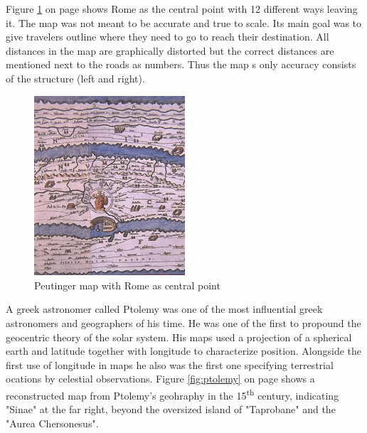 Figure \ref{fig:peutinger-rome} on page \pageref{fig:peutinger-rome} shows Rome as the central point with 12 different ways leaving it. The map was not meant to be accurate and true to scale. Its main goal was to give travelers outline where they need to go to reach their destination. All distances in the map are graphically distorted but the correct distances are mentioned next to the roads as numbers. Thus the map
s only accuracy consists of the structure (left and right).

\begin{figure}[!htb]
\centering
\includegraphics[width=0.5\textwidth,keepaspectratio]{images/history/peutinger_rom.jpg}
\caption[
    Peutinger map with Rome as central point, Urldate: 07.2016 \newline
\small\texttt{\url{https://web.archive.org/web/20060106224928/http://www.kargi.de/Geschichte/Peutinger/peutinger_rom.jpg}}
]{Peutinger map with Rome as central point}
\label{fig:peutinger-rome}
\end{figure}

A greek astronomer called Ptolemy was one of the most influential greek astronomers and geographers of his time. He was one of the first to propound the geocentric theory of the solar system. His maps used a projection of a spherical earth and latitude together with longitude to characterize position. Alongside the first use of longitude in maps he also was the first one specifying terrestrial ocations by celestial observations. Figure \ref{fig:ptolemy} on page \pageref{fig:ptolemy} shows a reconstructed map from Ptolemy's geohraphy in the 15\textsuperscript{th} century, indicating "Sinae" at the far right, beyond the oversized island of "Taprobane" and the "Aurea Chersonesus".

